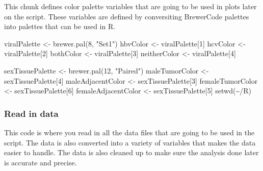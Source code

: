 \documentclass[
]{article}
\newenvironment{Shaded}{\begin{snugshade}}{\end{snugshade}}
\newcommand{\DecValTok}[1]{\textcolor[rgb]{0.00,0.00,0.81}{#1}}
\newcommand{\FunctionTok}[1]{\textcolor[rgb]{0.00,0.00,0.00}{#1}}
\newcommand{\NormalTok}[1]{#1}
\newcommand{\OtherTok}[1]{\textcolor[rgb]{0.56,0.35,0.01}{#1}}
\newcommand{\StringTok}[1]{\textcolor[rgb]{0.31,0.60,0.02}{#1}}
\begin{document}
This chunk defines color palette variables that are going to be used in
plots later on the script. These variables are defined by conversiting
BrewerCode palettes into palettes that can be used in R.

\begin{Shaded}
\begin{Highlighting}[]
\NormalTok{viralPalette }\OtherTok{\textless{}{-}} \FunctionTok{brewer.pal}\NormalTok{(}\DecValTok{8}\NormalTok{, }\StringTok{"Set1"}\NormalTok{)}
\NormalTok{hbvColor }\OtherTok{\textless{}{-}}\NormalTok{ viralPalette[}\DecValTok{1}\NormalTok{]}
\NormalTok{hcvColor }\OtherTok{\textless{}{-}}\NormalTok{ viralPalette[}\DecValTok{2}\NormalTok{]}
\NormalTok{bothColor }\OtherTok{\textless{}{-}}\NormalTok{ viralPalette[}\DecValTok{3}\NormalTok{]}
\NormalTok{neitherColor }\OtherTok{\textless{}{-}}\NormalTok{ viralPalette[}\DecValTok{4}\NormalTok{]}

\NormalTok{sexTissuePalette }\OtherTok{\textless{}{-}} \FunctionTok{brewer.pal}\NormalTok{(}\DecValTok{12}\NormalTok{, }\StringTok{"Paired"}\NormalTok{)}
\NormalTok{maleTumorColor }\OtherTok{\textless{}{-}}\NormalTok{ sexTissuePalette[}\DecValTok{4}\NormalTok{]}
\NormalTok{maleAdjacentColor }\OtherTok{\textless{}{-}}\NormalTok{ sexTissuePalette[}\DecValTok{3}\NormalTok{]}
\NormalTok{femaleTumorColor }\OtherTok{\textless{}{-}}\NormalTok{ sexTissuePalette[}\DecValTok{6}\NormalTok{]}
\NormalTok{femaleAdjacentColor }\OtherTok{\textless{}{-}}\NormalTok{ sexTissuePalette[}\DecValTok{5}\NormalTok{]}
\FunctionTok{setwd}\NormalTok{(}\StringTok{\textquotesingle{}\textasciitilde{}/R\textquotesingle{}}\NormalTok{)}
\end{Highlighting}
\end{Shaded}

\hypertarget{read-in-data}{%
\subsubsection{\texorpdfstring{\textbf{Read in
data}}{Read in data}}\label{read-in-data}}

This code is where you read in all the data files that are going to be
used in the script. The data is also converted into a variety of
variables that makes the data easier to handle. The data is also cleaned
up to make sure the analysis done later is accurate and precise.
\end{document}
